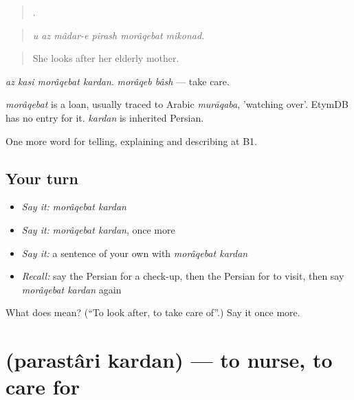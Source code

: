 \begin{quote}
     .
\end{quote}

\begin{quote}
\emph{u az mâdar-e pirash morâqebat mikonad.}
\end{quote}

\begin{quote}
She looks after her elderly mother.
\end{quote}

\emph{az kasi morâqebat kardan}. \emph{morâqeb bâsh} — take care.

\begin{cousinweb}
\emph{morâqebat} is a loan, usually traced to Arabic \emph{murāqaba}, 'watching over'. EtymDB has no entry for it. \emph{kardan} is inherited Persian.
\end{cousinweb}

\begin{grammarlens}[title={What you've built}]
One more word for telling, explaining and describing at B1.
\end{grammarlens}

\subsection*{Your turn}
\begin{itemize}
\raggedright
  \item \emph{Say it:} \emph{morâqebat kardan}
  \item \emph{Say it:} \emph{morâqebat kardan}, once more
  \item \emph{Say it:} a sentence of your own with \emph{morâqebat kardan}
  \item \emph{Recall:} say the Persian for a check-up, then the Persian for to visit, then say \emph{morâqebat kardan} again
\end{itemize}

\begin{tcolorbox}[breakable,colback=teal!4,colframe=teal!35!black,title={Before you move on}]
What does   mean? (\textquotedblleft{}To look after, to take care of\textquotedblright{}.) Say it once more.
\end{tcolorbox}
\section[\texorpdfstring{\fa{پرستاری} \fa{کردن} (parastâri kardan)}{پرستاری کردن (parastâri kardan)}]{  (parastâri kardan) — to nurse, to care for}

